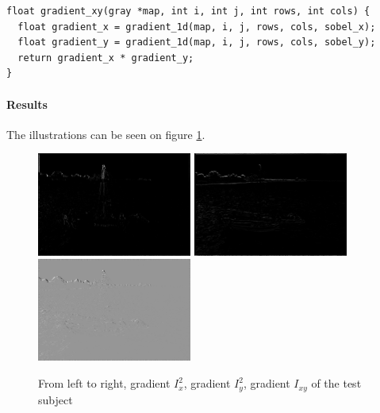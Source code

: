 \documentclass[a4paper, 10pt]{article}
\begin{document}
\begin{lstlisting}[frame=single]
float gradient_xy(gray *map, int i, int j, int rows, int cols) {
  float gradient_x = gradient_1d(map, i, j, rows, cols, sobel_x);
  float gradient_y = gradient_1d(map, i, j, rows, cols, sobel_y);
  return gradient_x * gradient_y;
}
\end{lstlisting}

\paragraph{Results} The illustrations can be seen on figure \ref{fig-gradient-square}.

\begin{figure}[!htb]
\centering
\includegraphics[width=192px]{boat3x3_5_grad_x2.png}
\includegraphics[width=192px]{boat3x3_5_grad_y2.png}
\includegraphics[width=192px]{boat3x3_5_grad_xy.png}
\caption{From left to right, gradient $I_x^2$, gradient $I_y^2$, gradient $I_{xy}$ of the test subject}
\label{fig-gradient-square}
\end{figure}





\begin{lstlisting}[frame=single]
\end{lstlisting}
\end{document}
